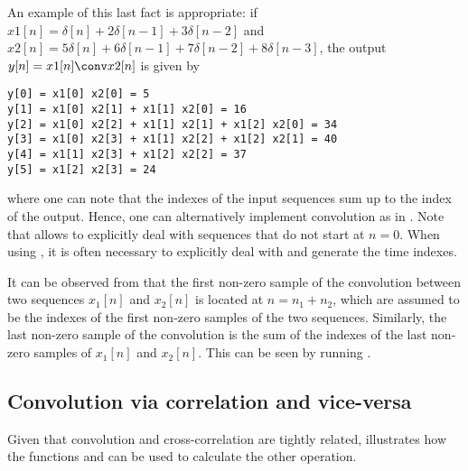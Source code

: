 An example of this last fact is appropriate: if $x1[n]=\delta[n]+2\delta[n-1]+3\delta[n-2]$ and 
$x2[n]=5\delta[n]+6\delta[n-1]+7\delta[n-2]+8\delta[n-3]$, the output $y[n]=x1[n] \conv x2[n]$ is given by
\begin{verbatim}
y[0] = x1[0] x2[0] = 5
y[1] = x1[0] x2[1] + x1[1] x2[0] = 16
y[2] = x1[0] x2[2] + x1[1] x2[1] + x1[2] x2[0] = 34
y[3] = x1[0] x2[3] + x1[1] x2[2] + x1[2] x2[1] = 40
y[4] = x1[1] x2[3] + x1[2] x2[2] = 37
y[5] = x1[2] x2[3] = 24
\end{verbatim}
where one can note that the indexes of the input sequences sum up to the index of the output.
Hence, one can alternatively implement convolution as in .
Note that  allows to explicitly deal with sequences that do not start at $n=0$. When using {\matlab}, it is often necessary to explicitly deal with and generate the time indexes.

It can be observed from  that the first non-zero sample of the convolution between two sequences $x_1[n]$ and  $x_2[n]$ is located at $n=n_1 + n_2$, which are assumed to be the indexes of the first non-zero samples of the two sequences. Similarly, the last non-zero sample of the convolution is the sum of the indexes of the last non-zero samples of $x_1[n]$ and  $x_2[n]$. This can be seen by running .


\subsection{{\akadvanced} Convolution via correlation and vice-versa}
\label{sec:convolutionViaCorrelation}

Given that convolution and cross-correlation are tightly related, 
 illustrates how the {\matlab} functions  and  can be used to calculate the other operation.

